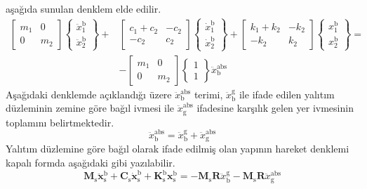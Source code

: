aşağıda sunulan denklem elde edilir. 
\begin{equation}
\begin{split}\begin{bmatrix}m_{1} & 0\\
0 & m_{2}
\end{bmatrix}\begin{Bmatrix}\ddot{x}_{1}^{\text{b}}\\
\ddot{x}_{2}^{\text{b}}
\end{Bmatrix}+ & \begin{bmatrix}c_{1}+c_{2} & -c_{2}\\
-c_{2} & c_{2}
\end{bmatrix}\begin{Bmatrix}\dot{x}_{1}^{\text{b}}\\
\dot{x}_{2}^{\text{b}}
\end{Bmatrix}+\begin{bmatrix}k_{1}+k_{2} & -k_{2}\\
-k_{2} & k_{2}
\end{bmatrix}\begin{Bmatrix}{x}_{1}^{\text{b}}\\
{x}_{2}^{\text{b}}
\end{Bmatrix}=\\
 & -\begin{bmatrix}m_{1} & 0\\
0 & m_{2}
\end{bmatrix}\begin{Bmatrix}1\\
1
\end{Bmatrix}\ddot{x}_{\text{b}}^{\text{abs}}
\end{split}
\label{eq-eom-singlestructure}
\end{equation}
Aşağıdaki denklemde açıklandığı üzere $\ddot{x}_{\text{b}}^{\text{abs}}$
terimi, $\ddot{x}_{\text{b}}^{\text{g}}$ ile ifade edilen yalıtım
düzleminin zemine göre bağıl ivmesi ile $\ddot{x}_{\text{g}}^{\text{abs}}$
ifadesine karşılık gelen yer ivmesinin toplamını belirtmektedir. 
\begin{equation}
\ddot{x}_{\text{b}}^{\text{abs}}=\ddot{x}_{\text{b}}^{\text{g}}+\ddot{x}_{\text{g}}^{\text{abs}}\label{eq-abs-base-acc}
\end{equation}
Yalıtım düzlemine göre bağıl olarak ifade edilmiş olan yapının hareket
denklemi kapalı formda aşağıdaki gibi yazılabilir. 
\begin{equation}
\mathbf{M}_{\text{s}}\mathbf{\ddot{x}}_{\text{s}}^{\text{b}}+\mathbf{C}_{\text{s}}\mathbf{\dot{x}}_{\text{s}}^{\text{b}}+\mathbf{K}_{\text{s}}^{\text{b}}\mathbf{x}_{\text{s}}^{\text{b}}=-\mathbf{M}_{\text{s}}\mathbf{R}\ddot{x}_{\text{b}}^{\text{g}}-\mathbf{M}_{\text{s}}\mathbf{R}\ddot{x}_{\text{g}}^{\text{abs}}\label{eq-eom-singlestructure-closed}
\end{equation}
